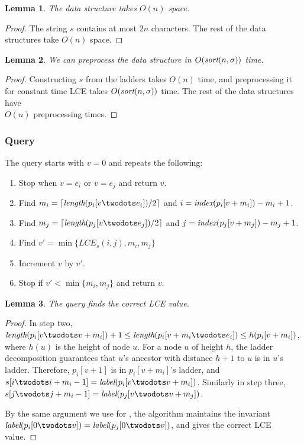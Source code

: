 \documentclass[a4]{article}
\newtheorem{lemma}{Lemma}
\begin{document}
\begin{lemma}
The  data structure takes $O(n)$ space.
\end{lemma}
\begin{proof}
The string $s$ contains at most $2n$ characters. The rest of the data structures take $O(n)$ space.
\end{proof}

\begin{lemma}
We can preprocess the  data structure in $O(\textit{sort}(n,\sigma))$ time.
\end{lemma}
\begin{proof}
Constructing $s$ from the ladders takes $O(n)$ time, and preprocessing it for constant time LCE takes $O(\textit{sort}(n,\sigma))$ time. The rest of the data structures have\\ $O(n)$ preprocessing times.
\end{proof}

\subsubsection{Query}

The  query starts with $v=0$ and repeats the following:
\begin{enumerate}
\item Stop when $v = e_i$ or $v = e_j$ and return $v$.
\item Find $m_i = \lceil\zlength(p_i[v\twodots e_i])/2\rceil$ and $i = \textit{index}(p_i[v+m_i]) - m_i + 1$.
\item Find $m_j = \lceil\zlength(p_j[v\twodots e_j])/2\rceil$ and $j = \textit{index}(p_j[v+m_j]) - m_j + 1$.
\item Find $v' = \min\{LCE_s(i,j),m_i,m_j\}$
\item Increment $v$ by $v'$.
\item Stop if $v' < \min\{m_i,m_j\}$ and return $v$.
\end{enumerate}

\begin{lemma}
The  query finds the correct LCE value.
\end{lemma}
\begin{proof}
In step two, $\zlength(p_i[v\twodots v+m_i]) +1 \leq \zlength(p_i[v+m_i\twodots e_i])\leq h(p_i[v+m_i])$, where $h(u)$ is the height of node $u$. For a node $u$ of height $h$, the ladder decomposition guarantees that $u$'s ancestor with distance $h+1$ to $u$ is in $u$'s ladder. Therefore, $p_i[v+1]$ is in $p_i[v+m_i]$'s ladder, and $s[i\twodots i+m_i-1] = \zlabel(p_i[v\twodots v+m_i])$. Similarly in step three, $s[j\twodots j+m_i-1]\\ = \zlabel(p_j[v\twodots v+m_j])$.

By the same argument we use for , the algorithm maintains the invariant $\zlabel(p_i[0\twodots v])=\zlabel(p_j[0\twodots v])$, and gives the correct LCE value.
\end{proof}
\end{document}
